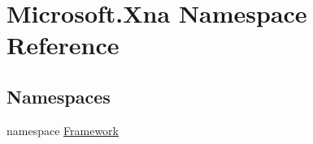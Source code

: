 \hypertarget{namespaceMicrosoft_1_1Xna}{}\section{Microsoft.\+Xna Namespace Reference}
\label{namespaceMicrosoft_1_1Xna}
\subsection*{Namespaces}
\begin{DoxyCompactItemize}
\item 
namespace \hyperlink{namespaceMicrosoft_1_1Xna_1_1Framework}{Framework}
\end{DoxyCompactItemize}
